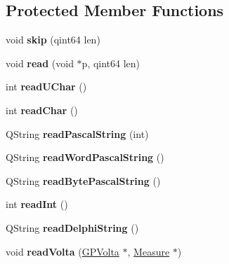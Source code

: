 \subsection*{Protected Member Functions}
\begin{DoxyCompactItemize}
\item 
\mbox{\label{class_ms_1_1_guitar_pro_a04f9fcb7c634d7bbdeedacb6a4efbd67}} 
void {\bfseries skip} (qint64 len)
\item 
\mbox{\label{class_ms_1_1_guitar_pro_a7c066fea608eea02acb4e6e7691cadf5}} 
void {\bfseries read} (void $\ast$p, qint64 len)
\item 
\mbox{\label{class_ms_1_1_guitar_pro_ae78eeea975a4cd984dc9504858449e3a}} 
int {\bfseries read\+U\+Char} ()
\item 
\mbox{\label{class_ms_1_1_guitar_pro_a1111255ffaa437dc883a0198165b157f}} 
int {\bfseries read\+Char} ()
\item 
\mbox{\label{class_ms_1_1_guitar_pro_a0b4f20dc952a695bb5c847353d432889}} 
Q\+String {\bfseries read\+Pascal\+String} (int)
\item 
\mbox{\label{class_ms_1_1_guitar_pro_af08026b39fe1b826f493027696d77d7e}} 
Q\+String {\bfseries read\+Word\+Pascal\+String} ()
\item 
\mbox{\label{class_ms_1_1_guitar_pro_adba4bed7bfebe46c9aa251aca111fb75}} 
Q\+String {\bfseries read\+Byte\+Pascal\+String} ()
\item 
\mbox{\label{class_ms_1_1_guitar_pro_ab2313ebee736546a0cf8298ba3d3e5bc}} 
int {\bfseries read\+Int} ()
\item 
\mbox{\label{class_ms_1_1_guitar_pro_a5322c0e9335e24e2ea7cb012dfd0bd91}} 
Q\+String {\bfseries read\+Delphi\+String} ()
\item 
\mbox{\label{class_ms_1_1_guitar_pro_a494168423cc7c524ce46296a2b6d795e}} 
void {\bfseries read\+Volta} (\hyperlink{struct_ms_1_1_g_p_volta}{G\+P\+Volta} $\ast$, \hyperlink{class_ms_1_1_measure}{Measure} $\ast$)

\end{DoxyCompactItemize}
